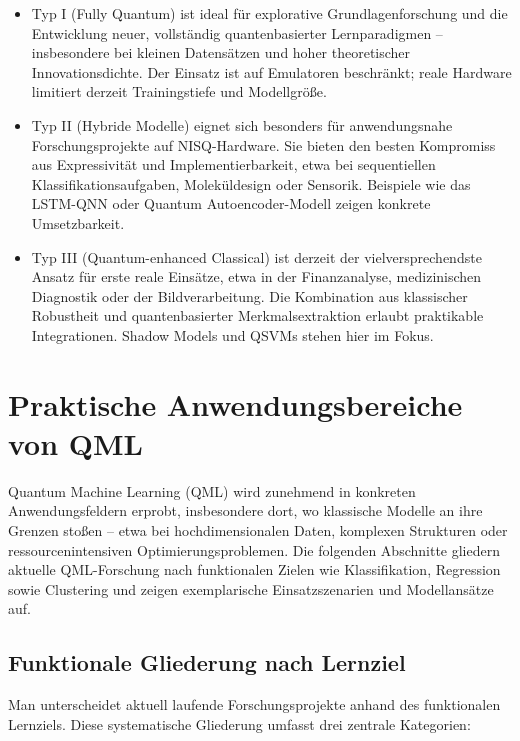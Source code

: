 \begin{itemize}
  \item Typ I (Fully Quantum) ist ideal für explorative Grundlagenforschung und die Entwicklung neuer, vollständig quantenbasierter Lernparadigmen – insbesondere bei kleinen Datensätzen und hoher theoretischer Innovationsdichte. Der Einsatz ist auf Emulatoren beschränkt; reale Hardware limitiert derzeit Trainingstiefe und Modellgröße.
  \vspace{0.5em}
  \item Typ II (Hybride Modelle) eignet sich besonders für anwendungsnahe Forschungsprojekte auf NISQ-Hardware. Sie bieten den besten Kompromiss aus Expressivität und Implementierbarkeit, etwa bei sequentiellen Klassifikationsaufgaben, Moleküldesign oder Sensorik. Beispiele wie das LSTM-QNN oder Quantum Autoencoder-Modell zeigen konkrete Umsetzbarkeit.
  \vspace{0.5em}
  \item Typ III (Quantum-enhanced Classical) ist derzeit der vielversprechendste Ansatz für erste reale Einsätze, etwa in der Finanzanalyse, medizinischen Diagnostik oder der Bildverarbeitung. Die Kombination aus klassischer Robustheit und quantenbasierter Merkmalsextraktion erlaubt praktikable Integrationen. Shadow Models und QSVMs stehen hier im Fokus.
\end{itemize}




\section{Praktische Anwendungsbereiche von QML}
Quantum Machine Learning (QML) wird zunehmend in konkreten Anwendungsfeldern erprobt, insbesondere dort, wo klassische Modelle an ihre Grenzen stoßen – etwa bei hochdimensionalen Daten, komplexen Strukturen oder ressourcenintensiven Optimierungsproblemen. Die folgenden Abschnitte gliedern aktuelle QML-Forschung nach funktionalen Zielen wie Klassifikation, Regression sowie Clustering und zeigen exemplarische Einsatzszenarien und Modellansätze auf.

\subsection{Funktionale Gliederung nach Lernziel}
Man unterscheidet aktuell laufende Forschungsprojekte anhand des funktionalen Lernziels. Diese systematische Gliederung umfasst drei zentrale Kategorien:
\vspace{0.3cm}

